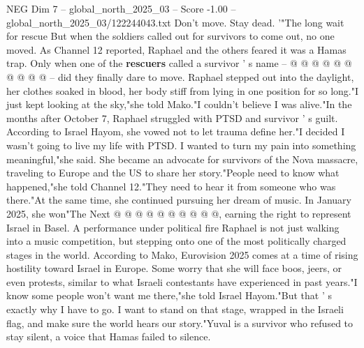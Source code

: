\begin{textsample}{NEG Dim 7 – global\_north\_2025\_03 – Score -1.00 – global\_north\_2025\_03/122244043.txt}
Don't move.
Stay dead. '"The long wait for rescue But when the soldiers called out for survivors to come out, no one moved.
As Channel 12 reported, Raphael and the others feared it was a Hamas trap.
Only when one of the \textbf{rescuers} called a survivor ' s name -- @ @ @ @ @ @ @ @ @ @ -- did they finally dare to move.
Raphael stepped out into the daylight, her clothes soaked in blood, her body stiff from lying in one position for so long."I just kept looking at the sky,"she told Mako."I couldn't believe I was alive."In the months after October 7, Raphael struggled with PTSD and survivor ' s guilt.
According to Israel Hayom, she vowed not to let trauma define her."I decided I wasn't going to live my life with PTSD.
I wanted to turn my pain into something meaningful,"she said.
She became an advocate for survivors of the Nova massacre, traveling to Europe and the US to share her story."People need to know what happened,"she told Channel 12."They need to hear it from someone who was there."At the same time, she continued pursuing her dream of music.
In January 2025, she won"The Next @ @ @ @ @ @ @ @ @ @, earning the right to represent Israel in Basel.
A performance under political fire Raphael is not just walking into a music competition, but stepping onto one of the most politically charged stages in the world.
According to Mako, Eurovision 2025 comes at a time of rising hostility toward Israel in Europe.
Some worry that she will face boos, jeers, or even protests, similar to what Israeli contestants have experienced in past years."I know some people won't want me there,"she told Israel Hayom."But that ' s exactly why I have to go.
I want to stand on that stage, wrapped in the Israeli flag, and make sure the world hears our story."Yuval is a survivor who refused to stay silent, a voice that Hamas failed to silence.

\end{textsample}
